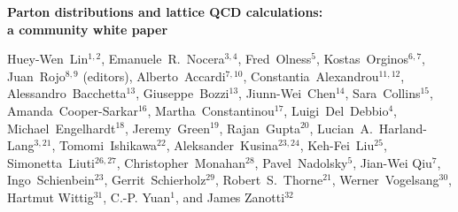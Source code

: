 \documentclass[twoside,12pt]{article}
\numberwithin{equation}{section}
\numberwithin{figure}{section}
\numberwithin{table}{section}
\begin{document}
\linenumbers
\vspace{.3cm}

\begin{center}
{\Large \bf Parton distributions and lattice QCD calculations:
\\[0.2cm] a community white paper}
\vspace{.4cm}

{\small 
  Huey-Wen~Lin$^{1,2}$,
  Emanuele~R.~Nocera$^{3,4}$,
  Fred~Olness$^5$,
  Kostas~Orginos$^{6,7}$,
  Juan~Rojo$^{8,9}$ (editors),
  Alberto~Accardi$^{7,10}$, 
  Constantia~Alexandrou$^{11,12}$, 
  Alessandro~Bacchetta$^{13}$, 
  Giuseppe~Bozzi$^{13}$, 
  Jiunn-Wei~Chen$^{14}$,
  Sara~Collins$^{15}$, 	
  Amanda~Cooper-Sarkar$^{16}$,
  Martha~Constantinou$^{17}$, 
  Luigi~Del~Debbio$^{4}$, 
  Michael~Engelhardt$^{18}$, 
  Jeremy~Green$^{19}$, 
  Rajan~Gupta$^{20}$, 
  Lucian~A.~Harland-Lang$^{3,21}$, 
  Tomomi~Ishikawa$^{22}$, 
  Aleksander~Kusina$^{23,24}$, 
  Keh-Fei~Liu$^{25}$, 	
  Simonetta~Liuti$^{26,27}$, 		
  Christopher~Monahan$^{28}$, 		
  Pavel~Nadolsky$^{5}$,
  Jian-Wei Qiu$^{7}$,
  Ingo~Schienbein$^{23}$, 	
  Gerrit~Schierholz$^{29}$,
  Robert~S.~Thorne$^{21}$,
  Werner~Vogelsang$^{30}$,
  Hartmut Wittig$^{31}$, 
  C.-P. Yuan$^{1}$, and
  James Zanotti$^{32}$
}


\end{center}
\end{document}
